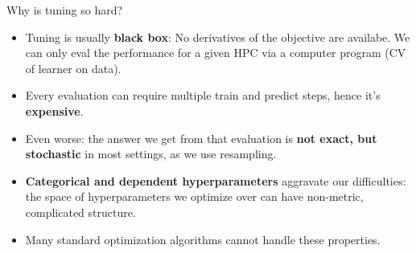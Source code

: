 \documentclass[11pt,compress,t,notes=noshow, xcolor=table]{beamer}
\begin{document}
\begin{vbframe}{Why is tuning so hard?}
  \begin{itemize}
\item Tuning is usually \textbf{black box}: No derivatives of the objective are availabe. 
    We can only eval the performance for a given HPC via a computer program (CV of learner on data).
\item Every evaluation can require multiple train and predict steps, hence it's \textbf{expensive}.
\item Even worse: the answer we get from that evaluation is \textbf{not exact, but stochastic} in most settings, as we use resampling.
\item \textbf{Categorical and dependent hyperparameters} aggravate our difficulties: the space of hyperparameters we optimize over can have non-metric, complicated structure.
\item Many standard optimization algorithms cannot handle these properties.
\end{itemize}

  \end{vbframe}

\endlecture
\end{document}
